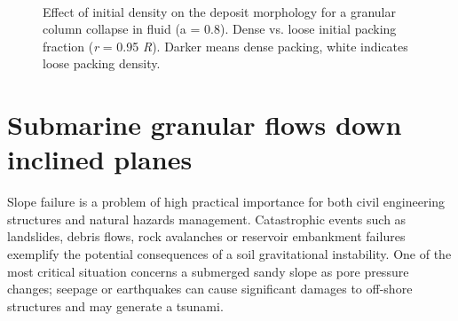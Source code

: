 \begin{figure}[htbp]
\centering
{}\\
\caption[Effect of initial density on the deposit morphology
for a granular column collapse in fluid (a = 0.8).]{Effect of initial density 
on the deposit morphology
for a granular column collapse in fluid (a = 0.8). Dense vs. loose initial 
packing fraction (\textit{r} = 0.95 \textit{R}). Darker means dense packing, 
white indicates 
loose 
packing density.}
\label{fig:Dense_Loose_PT}
\end{figure}




\clearpage


\section{Submarine granular flows down inclined planes}

Slope failure is a problem of high practical importance for both civil 
engineering structures and natural hazards management. Catastrophic events such 
as landslides, debris flows, rock avalanches or reservoir embankment failures 
exemplify the potential consequences of a soil gravitational instability. One 
of the most critical situation concerns a submerged sandy slope as pore 
pressure changes; seepage or earthquakes can cause significant damages to 
off-shore structures and may generate a tsunami.

